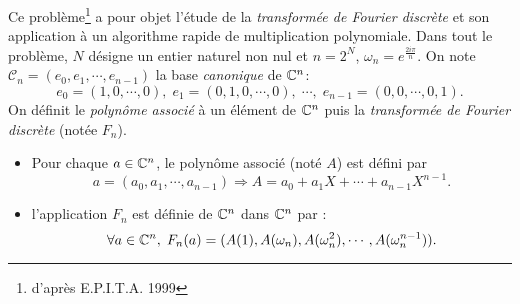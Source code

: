 
Ce problème\footnote{d'après E.P.I.T.A. 1999} a pour objet l'étude de la \emph{transformée de Fourier discrète} et son application à un algorithme rapide de multiplication polynomiale.
\newline
Dans tout le problème, $N$ désigne un entier naturel non nul et $n = 2^N$, $\omega_n = e^{\frac{2 i \pi}{n}}$.\newline
On note $\mathcal C _n = (e_0,e_1,\cdots ,e_{n-1})$ la base \emph{canonique} de $\mathbb{C}^n$:
\begin{displaymath}
 e_0=(1,0,\cdots,0),\; e_1=(0,1,0,\cdots,0),\;\cdots,\; e_{n-1}=(0,0,\cdots,0,1).
\end{displaymath}
On définit le \emph{polynôme associé} à un élément de $\mathbb{C}^n$ puis la \emph{transformée de Fourier discrète} (notée $F_n$).
\begin{itemize}
 \item Pour chaque $a\in \mathbb{C}^n$, le polynôme associé (noté $A$) est défini par 
\begin{displaymath}
 a=(a_0,a_1,\cdots,a_{n-1}) \Rightarrow A = a_0+a_1X+\cdots + a_{n-1} X^{n-1}.
\end{displaymath}
\item l'application $F_n$ est définie de $\mathbb{C}^n$ dans $\mathbb{C}^n$ par :
\begin{displaymath}
 \forall a\in \mathbb{C}^n,\; F_n(a) = (A(1), A(\omega_n), A(\omega_n^2), \cdots, A(\omega_n^{n-1})).
\end{displaymath}
\end{itemize}

